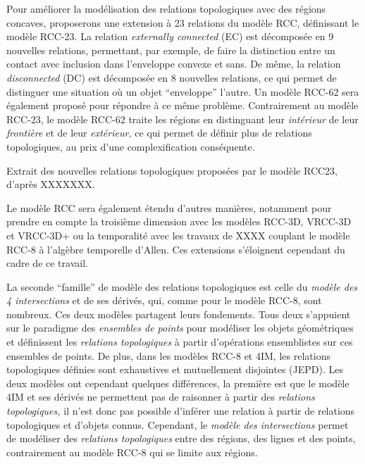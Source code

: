 Pour améliorer la modélisation des relations topologiques avec des
régions concaves, \textcite{Cohn1997} proposerons une extension à 23
relations du modèle RCC, définissant le modèle RCC-23. La relation
\emph{externally connected} (EC) est décomposée en 9 nouvelles
relations, permettant, par exemple, de faire la distinction entre un
contact avec inclusion dans l'enveloppe convexe et sans. De même, la
relation \emph{disconnected} (DC) est décomposée en 8 nouvelles
relations, ce qui permet de distinguer une situation où un objet
\enquote{enveloppe} l'autre. Un modèle RCC-62 sera également proposé
pour répondre à ce même problème. Contrairement au modèle RCC-23, le
modèle RCC-62 traite les régions en distinguant leur \emph{intérieur}
de leur \emph{frontière} et de leur \emph{extérieur,} ce qui permet de
définir plus de relations topologiques, au prix d'une complexification
conséquente.

\begin{table}
  \centering
  
  \caption{Extrait des nouvelles relations topologiques proposées par
le modèle RCC23, d'après XXXXXXX.}
  \label{tab:RCC8_vs_RCC23}
\end{table}

Le modèle RCC sera également étendu d'autres manières, notamment pour
prendre en compte la troisième dimension avec les modèles RCC-3D,
VRCC-3D et VRCC-3D+ ou la temporalité avec les travaux de XXXX
couplant le modèle RCC-8 à l'algèbre temporelle d'Allen. Ces
extensions s'éloignent cependant du cadre de ce travail.

La seconde \enquote{famille} de modèle des relations topologiques est
celle du \emph{modèle des 4 intersections}
\autocite[4IM,][]{Egenhofer1989} et de ses dérivés, qui, comme pour le
modèle RCC-8, sont nombreux. Ces deux modèles partagent leurs
fondements. Tous deux s’appuient sur le paradigme des \emph{ensembles
  de points} pour modéliser les objets géométriques et définissent les
\emph{relations topologiques} à partir d'opérations ensemblistes sur
ces ensembles de points. De plus, dans les modèles RCC-8
\autocite{Randell1992} et 4IM, les relations topologiques définies
sont exhaustives et mutuellement disjointes (JEPD). Les deux modèles
ont cependant quelques différences, la première est que le modèle 4IM
et ses dérivés ne permettent pas de raisonner à partir des
\emph{relations topologiques,} il n'est donc pas possible d'inférer
une relation à partir de relations topologiques et d'objets
connus. Cependant, le \emph{modèle des intersections} permet de
modéliser des \emph{relations topologiques} entre des régions, des
lignes et des points, contrairement au modèle RCC-8 qui se limite aux
régions.


